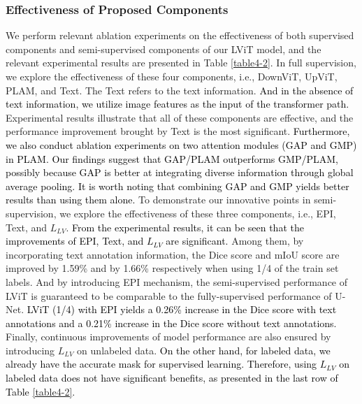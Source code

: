 \documentclass[lettersize,journal]{IEEEtran}
\begin{document}
\subsubsection{Effectiveness of Proposed Components}
We perform relevant ablation experiments on the effectiveness of both supervised components and semi-supervised components of our LViT model, and the relevant experimental results are presented in Table \ref{table4-2}. In full supervision, we explore the effectiveness of these four components, i.e., DownViT, UpViT, PLAM, and Text. The Text refers to the text information. 
\textcolor{black}{And in the absence of text information, we utilize image features as the input of the transformer path.}
Experimental results illustrate that all of these components are effective, and the performance improvement brought by Text is the most significant.
\textcolor{black}{
Furthermore, we also conduct ablation experiments on two attention modules (GAP and GMP) in PLAM. Our findings suggest that GAP/PLAM outperforms GMP/PLAM, possibly because GAP is better at integrating  diverse information through global average pooling. It is worth noting that combining GAP and GMP yields better results than using them alone.}
To demonstrate our innovative points in semi-supervision, we explore the effectiveness of these three components, i.e., EPI, Text, and $L_{LV}$. \textcolor{black}{From the experimental results, it can be seen that the improvements of EPI, Text, and $L_{LV}$ are significant.} Among them, by incorporating text annotation information, the Dice score and mIoU score are improved by 1.59\% and by 1.66\% respectively when using 1/4 of the train set labels. And by introducing EPI mechanism, the semi-supervised performance of LViT is guaranteed to be comparable to the fully-supervised performance of U-Net. \textcolor{black}{LViT (1/4) with EPI yields a 0.26\% increase in the Dice score with text annotations and a 0.21\% increase in the Dice score without text annotations.} Finally, continuous improvements of model performance are also ensured by introducing $L_{LV}$ on unlabeled data. 
\textcolor{black}{
On the other hand, for labeled data, we already have the accurate mask for supervised learning. Therefore, using $L_{LV}$ on labeled data does not have significant benefits, as presented in the last row of Table \ref{table4-2}.}
\vspace{-2mm}
\end{document}
